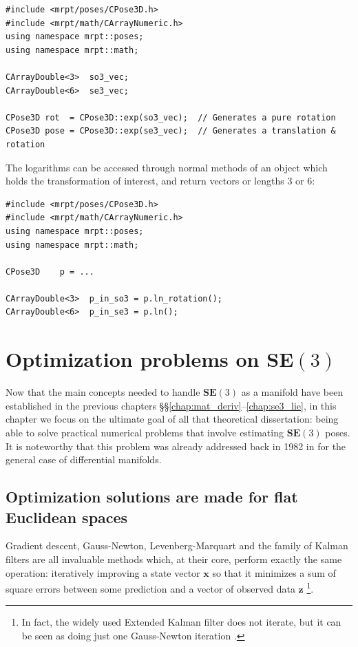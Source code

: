 \documentclass[a4paper,11pt]{report}
\begin{document}
\begin{lstlisting}
#include <mrpt/poses/CPose3D.h>
#include <mrpt/math/CArrayNumeric.h>
using namespace mrpt::poses;
using namespace mrpt::math;

CArrayDouble<3>  so3_vec;
CArrayDouble<6>  se3_vec;

CPose3D rot  = CPose3D::exp(so3_vec);  // Generates a pure rotation
CPose3D pose = CPose3D::exp(se3_vec);  // Generates a translation & rotation
\end{lstlisting}


The logarithms can be accessed through normal methods of an object which
holds the transformation of interest, and return vectors or lengths 3 or 6:

\begin{lstlisting}
#include <mrpt/poses/CPose3D.h>
#include <mrpt/math/CArrayNumeric.h>
using namespace mrpt::poses;
using namespace mrpt::math;

CPose3D    p = ...

CArrayDouble<3>  p_in_so3 = p.ln_rotation();
CArrayDouble<6>  p_in_se3 = p.ln();
\end{lstlisting}




\chapter{Optimization problems on $\mathbf{SE}(3)$}
\label{ch:se3_optim}

Now that the main concepts needed to handle $\mathbf{SE}(3)$
as a manifold have been established in
the previous chapters \S\S\ref{chap:mat_deriv}--\ref{chap:se3_lie},
in this chapter we focus on the ultimate goal of all that theoretical
dissertation: being able to solve practical numerical
problems that involve
estimating $\mathbf{SE}(3)$ poses.
It is noteworthy that this problem was already addressed back in 1982 in \cite{gabay1982mdf} for the general case of differential manifolds.


\section{Optimization solutions are made for flat Euclidean spaces}

Gradient descent, Gauss-Newton, Levenberg-Marquart and the family of Kalman
filters are all
invaluable methods which, at their core, perform exactly the same operation:
iteratively improving a state vector $\mathbf{x}$ so that it minimizes
a sum of square errors between some prediction and a vector of observed data $\mathbf{z}$
\footnote{In fact, the widely used Extended Kalman filter does not iterate,
but it can be seen as doing just one Gauss-Newton iteration \cite{bell1993ikf}.}.
\end{document}
